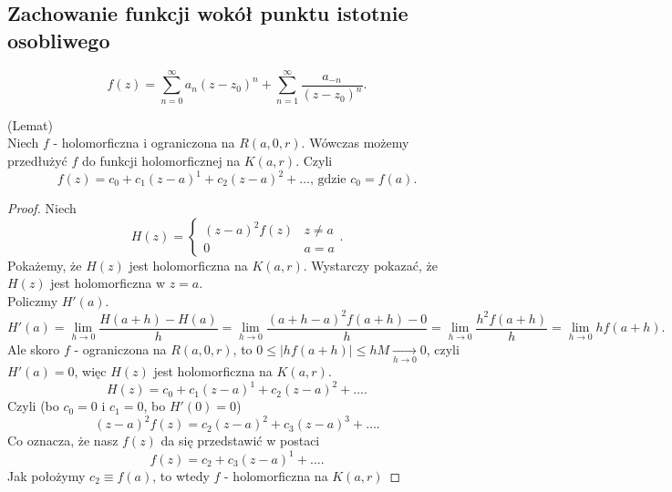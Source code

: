 \documentclass[../main.tex]{subfiles}
\begin{document}
\subsection{Zachowanie funkcji wokół punktu istotnie osobliwego}
\[
    f(z) = \sum_{n=0}^{\infty} a_n(z-z_0)^n + \sum_{n=1}^{\infty} \frac{a_{-n}}{(z-z_0)^n}
.\]
\begin{tw}
    (Lemat)\\
    Niech $f$ - holomorficzna i ograniczona na $R(a,0,r)$. Wówczas możemy przedłużyć $f$ do funkcji holomorficznej na $K(a,r)$. Czyli
    \[
        f(z) = c_0 + c_1(z-a)^1 + c_2(z-a)^2 + \ldots\text{, gdzie } c_0 = f(a)
    .\]
\end{tw}
\begin{proof}
    Niech
    \[H(z) = \begin{cases}
        (z-a)^2f(z)& z\neq a\\ 0 & a = a
    \end{cases}
    .\]
    Pokażemy, że $H(z)$ jest holomorficzna na $K(a,r)$. Wystarczy pokazać, że $H(z)$ jest holomorficzna w $z = a$. \\
    Policzmy $H'(a)$.
    \[
        H'(a) = \lim\limits_{h\to 0}\frac{H(a+h) - H(a)}{h} = \lim\limits_{h\to 0}\frac{(a+h-a)^2f(a+h) - 0}{h} = \lim\limits_{h\to 0}\frac{h^2f(a+h)}{h} = \lim\limits_{h\to 0} hf(a+h)
    .\]
Ale skoro $f$ - ograniczona na $R(a,0,r)$, to $0 \le \left| h f(a+h) \right| \le h M \underset{h\to 0}{\longrightarrow} 0$, czyli $H'(a) = 0$, więc $H(z)$ jest holomorficzna na $K(a,r)$.
\[
    H(z) = c_0 + c_1(z-a)^1 + c_2(z-a)^2 + \ldots
.\]
Czyli (bo $c_0 = 0$ i $c_1 = 0$, bo $H'(0) = 0$)
\[
    (z-a)^2f(z) = c_2(z-a)^2 + c_3(z-a)^3 + \ldots
.\]
Co oznacza, że nasz $f(z)$ da się przedstawić w postaci
\[
    f(z) = c_2 + c_3(z-a)^1 + \ldots
.\]
Jak położymy $c_2 \equiv f(a)$, to wtedy $f$ - holomorficzna na $K(a,r)$
\end{proof}
\end{document}
